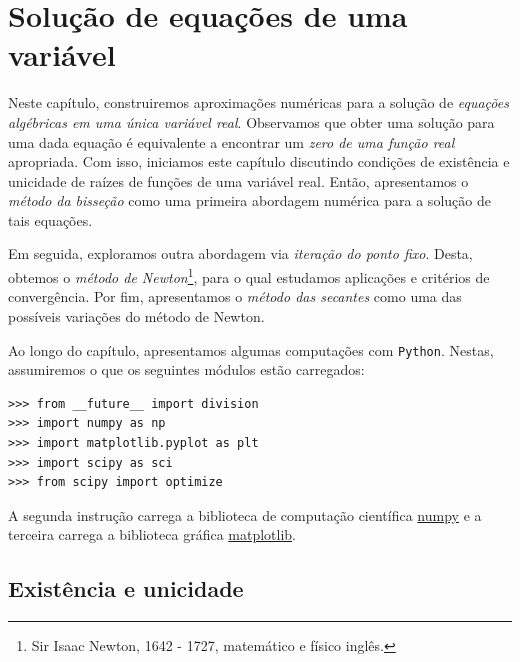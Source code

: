 
%

\chapter{Solução de equações de uma variável}

Neste capítulo, construiremos aproximações numéricas para a solução de \emph{equações algébricas em uma única variável real}. Observamos que obter uma solução para uma dada equação é equivalente a encontrar um \emph{zero de uma função real} apropriada. Com isso, iniciamos este capítulo discutindo condições de existência e unicidade de raízes de funções de uma variável real. Então, apresentamos o \emph{método da bisseção} como uma primeira abordagem numérica para a solução de tais equações.

Em seguida, exploramos outra abordagem via \emph{iteração do ponto fixo}. Desta, obtemos o \emph{método de Newton}\footnote{Sir Isaac Newton, 1642 - 1727, matemático e físico inglês.}, para o qual estudamos aplicações e critérios de convergência. Por fim, apresentamos o \emph{método das secantes} como uma das possíveis variações do método de Newton.

\ifispython
Ao longo do capítulo, apresentamos algumas computações com \verb+Python+. Nestas, assumiremos o que os seguintes módulos estão carregados:
\begin{verbatim}
>>> from __future__ import division
>>> import numpy as np
>>> import matplotlib.pyplot as plt
>>> import scipy as sci
>>> from scipy import optimize
\end{verbatim}
A segunda instrução carrega a biblioteca de computação científica \href{http://www.numpy.org/}{numpy} e a terceira carrega a biblioteca gráfica \href{http://matplotlib.org/}{matplotlib}.
\fi

\section{Existência e unicidade}

